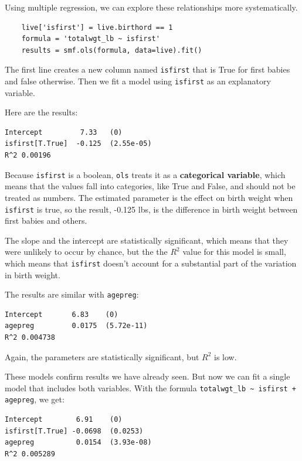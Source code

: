 \documentclass[12pt]{book}
\begin{document}
Using multiple regression, we can explore these relationships
more systematically.

\begin{verbatim}
    live['isfirst'] = live.birthord == 1
    formula = 'totalwgt_lb ~ isfirst'
    results = smf.ols(formula, data=live).fit()
\end{verbatim}

The first line creates a new column named \verb"isfirst" that is
True for first babies and false otherwise.  Then we fit a model
using \verb"isfirst" as an explanatory variable.

Here are the results:

\begin{verbatim}
Intercept         7.33   (0)
isfirst[T.True]  -0.125  (2.55e-05)
R^2 0.00196
\end{verbatim}

Because \verb"isfirst" is a boolean, \verb"ols" treats it as a
{\bf categorical variable}, which means that the values fall
into categories, like True and False, and should not be treated
as numbers.  The estimated parameter is the effect on birth
weight when \verb"isfirst" is true, so the result,
-0.125 lbs, is the difference in
birth weight between first babies and others.  

The slope and the intercept are statistically significant,
which means that they were unlikely to occur by chance, but the
the $R^2$ value for this model is small, which means that
\verb"isfirst" doesn't account for a substantial part of the
variation in birth weight.

The results are similar with \verb"agepreg":

\begin{verbatim}
Intercept       6.83    (0)
agepreg         0.0175  (5.72e-11)
R^2 0.004738
\end{verbatim}

Again, the parameters are statistically significant, but
$R^2$ is low.

These models confirm results we have already seen.  But now we
can fit a single model that includes both variables.  With the
formula \verb"totalwgt_lb ~ isfirst + agepreg", we get:

\begin{verbatim}
Intercept        6.91    (0)
isfirst[T.True] -0.0698  (0.0253)
agepreg          0.0154  (3.93e-08)
R^2 0.005289
\end{verbatim}
\end{document}
